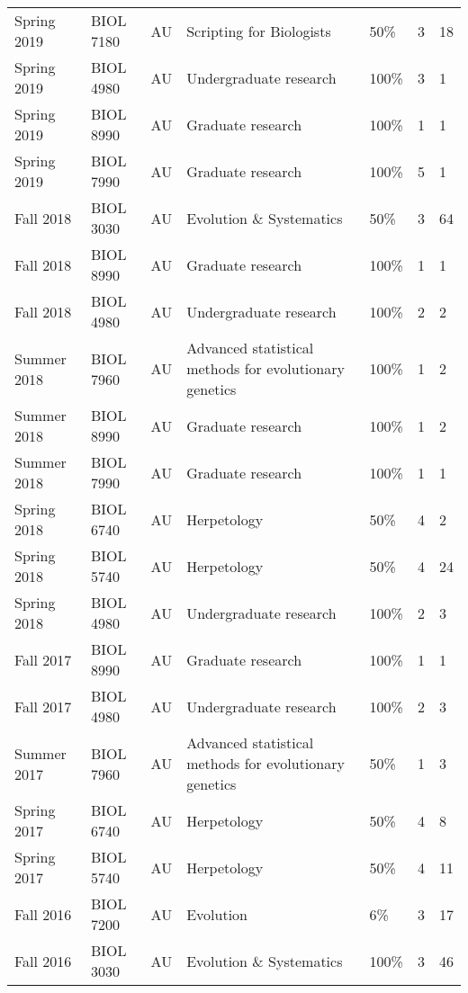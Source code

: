 {\begin{longtable}[l]{ p{0.79in} p{0.65in} p{0.60in} p{1.7in} p{0.58in} p{0.34in} p{0.70in} }
    Spring 2019 & BIOL 7180 & AU & Scripting for Biologists & 50\% & 3 & 18 \\
    Spring 2019 & BIOL 4980 & AU & Undergraduate research & 100\% & 3 & 1 \\ 
    Spring 2019 & BIOL 8990 & AU & Graduate research & 100\% & 1 & 1 \\ 
    Spring 2019 & BIOL 7990 & AU & Graduate research & 100\% & 5 & 1 \\ 
    Fall 2018 & BIOL 3030 & AU & Evolution \& Systematics & 50\% & 3 & 64 \\
    Fall 2018 & BIOL 8990 & AU & Graduate research & 100\% & 1 & 1 \\ 
    Fall 2018 & BIOL 4980 & AU & Undergraduate research & 100\% & 2 & 2 \\ 
    Summer 2018 & BIOL 7960 & AU & Advanced statistical methods for evolutionary genetics & 100\% & 1 & 2 \\
    Summer 2018 & BIOL 8990 & AU & Graduate research & 100\% & 1 & 2 \\ 
    Summer 2018 & BIOL 7990 & AU & Graduate research & 100\% & 1 & 1 \\ 
    Spring 2018 & BIOL 6740 & AU & Herpetology & 50\% & 4 & 2 \\
    Spring 2018 & BIOL 5740 & AU & Herpetology & 50\% & 4 & 24 \\
    Spring 2018 & BIOL 4980 & AU & Undergraduate research & 100\% & 2 & 3 \\ 
    Fall 2017 & BIOL 8990 & AU & Graduate research & 100\% & 1 & 1 \\ 
    Fall 2017 & BIOL 4980 & AU & Undergraduate research & 100\% & 2 & 3 \\ 
    Summer 2017 & BIOL 7960 & AU & Advanced statistical methods for evolutionary genetics & 50\% & 1 & 3 \\
    Spring 2017 & BIOL 6740 & AU & Herpetology & 50\% & 4 & 8 \\
    Spring 2017 & BIOL 5740 & AU & Herpetology & 50\% & 4 & 11 \\
    Fall 2016 & BIOL 7200 & AU & Evolution & 6\% & 3 & 17 \\
    Fall 2016 & BIOL 3030 & AU & Evolution \& Systematics & 100\% & 3 & 46 \\
\end{longtable}
}
